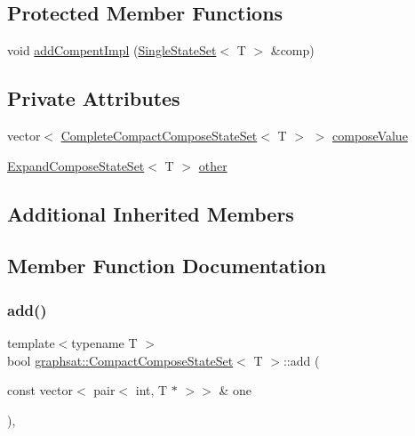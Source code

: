 \subsection*{Protected Member Functions}
\begin{DoxyCompactItemize}
\item 
void \mbox{\hyperlink{classgraphsat_1_1_compact_compose_state_set_a11bd85b646593e15141f597abbe301da}{add\+Compent\+Impl}} (\mbox{\hyperlink{classgraphsat_1_1_single_state_set}{Single\+State\+Set}}$<$ T $>$ \&comp)
\end{DoxyCompactItemize}
\subsection*{Private Attributes}
\begin{DoxyCompactItemize}
\item 
vector$<$ \mbox{\hyperlink{classgraphsat_1_1_complete_compact_compose_state_set}{Complete\+Compact\+Compose\+State\+Set}}$<$ T $>$ $>$ \mbox{\hyperlink{classgraphsat_1_1_compact_compose_state_set_a1ae2638718a79420fee5bc46acbf38e3}{compose\+Value}}
\item 
\mbox{\hyperlink{classgraphsat_1_1_expand_compose_state_set}{Expand\+Compose\+State\+Set}}$<$ T $>$ \mbox{\hyperlink{classgraphsat_1_1_compact_compose_state_set_a4ef448e71ad29452d64c8d625dd49bef}{other}}
\end{DoxyCompactItemize}
\subsection*{Additional Inherited Members}


\subsection{Member Function Documentation}
\mbox{\label{classgraphsat_1_1_compact_compose_state_set_ad728351fbf1e81740088147289ef3884}} 
\subsubsection{\texorpdfstring{add()}{add()}}
{\footnotesize\ttfamily template$<$typename T $>$ \\
bool \mbox{\hyperlink{classgraphsat_1_1_compact_compose_state_set}{graphsat\+::\+Compact\+Compose\+State\+Set}}$<$ T $>$\+::add (\begin{DoxyParamCaption}\item[{const vector$<$ pair$<$ int, T $\ast$ $>$$>$ \&}]{one }\end{DoxyParamCaption})\hspace{0.3cm}{\ttfamily [inline]}, {\ttfamily [virtual]}}



